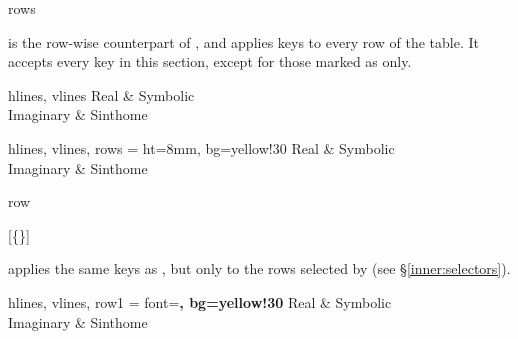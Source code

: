 \begin{codedescribe}[
    key,
    new=2021F,
    update=2021L
  ]{rows}
  \begin{codesyntax}
  \end{codesyntax}
   is the row-wise counterpart of , and applies keys to every row of the table. It accepts every key in this section, except for those marked as  only.

  \begin{codestore}[st=columns:rows]
    \begin{tblr}{hlines, vlines}
      Real      & Symbolic \\
      Imaginary & Sinthome
    \end{tblr}\quad
    \begin{tblr}{
        hlines, vlines,
        rows = {ht=8mm, bg=yellow!30}
      }
      Real      & Symbolic \\
      Imaginary & Sinthome
    \end{tblr}\end{codestore}
  \begin{center}
  \end{center}
\end{codedescribe}

\begin{codedescribe}[
    key,
    new=2021F
  ]{row}
  \begin{codesyntax}
    [\{\}]
  \end{codesyntax}
   applies the same keys as , but only to the rows selected by  (see \S\ref{inner:selectors}).

  \begin{codestore}[st=columns:row]
    \begin{tblr}{
        hlines, vlines,
        row{1} = {font=\bfseries, bg=yellow!30}
      }
      Real      & Symbolic \\
      Imaginary & Sinthome
    \end{tblr}\end{codestore}
  \begin{center}
  \end{center}
\end{codedescribe}

